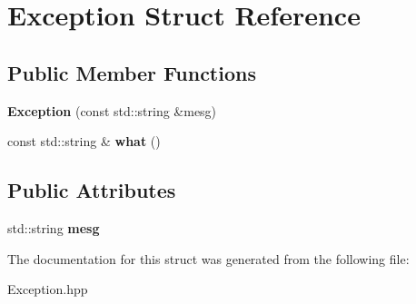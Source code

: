 \hypertarget{struct_exception}{}\section{Exception Struct Reference}
\label{struct_exception}
\subsection*{Public Member Functions}
\begin{DoxyCompactItemize}
\item 
\mbox{\label{struct_exception_a1799400f70924aba093edbc6f2ba6bfe}} 
{\bfseries Exception} (const std\+::string \&mesg)
\item 
\mbox{\label{struct_exception_a19be342664e9da07334b8fbe7a253909}} 
const std\+::string \& {\bfseries what} ()
\end{DoxyCompactItemize}
\subsection*{Public Attributes}
\begin{DoxyCompactItemize}
\item 
\mbox{\label{struct_exception_ab13c042e7d550445aa548240ee2ed3e2}} 
std\+::string {\bfseries mesg}
\end{DoxyCompactItemize}


The documentation for this struct was generated from the following file\+:\begin{DoxyCompactItemize}
\item 
Exception.\+hpp\end{DoxyCompactItemize}
